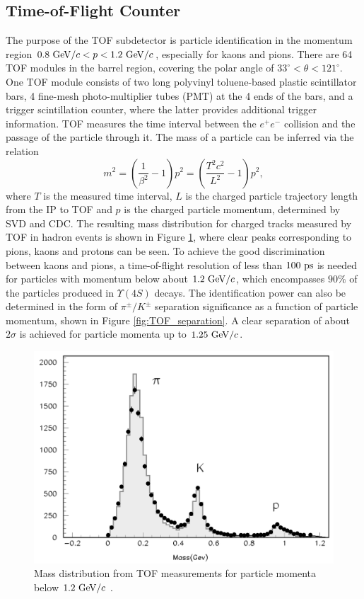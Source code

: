\subsection{Time-of-Flight Counter}

The purpose of the TOF subdetector is particle identification in the momentum region $0.8\mathrm{~GeV}/c < p < 1.2\mathrm{~GeV}/c$, especially for kaons and pions. There are 64 TOF modules in the barrel region, covering the polar angle of $33^\circ < \theta < 121^\circ$. One TOF module consists of two long polyvinyl toluene-based plastic scintillator bars, 4 fine-mesh photo-multiplier tubes (PMT) at the 4 ends of the bars, and a trigger scintillation counter, where the latter provides additional trigger information. TOF measures the time interval between the $e^+e^-$ collision and the passage of the particle through it. The mass of a particle can be inferred via the relation
\begin{equation}
m^2 = \left( \frac{1}{\beta^2}-1\right)p^2 = \left( \frac{T^2c^2}{L^2}-1\right)p^2,
\end{equation}
where $T$ is the measured time interval, $L$ is the charged particle trajectory length from the IP to TOF and $p$ is the charged particle momentum, determined by SVD and CDC. The resulting mass distribution for charged tracks measured by TOF in hadron events is shown in Figure \ref{fig:TOF_mass}, where clear peaks corresponding to pions, kaons and protons can be seen. To achieve the good discrimination between kaons and pions, a time-of-flight resolution of less than $100\mathrm{~ps}$ is needed for particles with momentum below about $1.2\mathrm{~GeV}/c$, which encompasses $90\%$ of the particles produced in $\Upsilon(4S)$ decays. The identification power can also be determined in the form of $\pi^\pm/K^\pm$ separation significance as a function of particle momentum, shown in Figure \ref{fig:TOF_separation}. A clear separation of about $2\sigma$ is achieved for particle momenta up to $1.25\mathrm{~GeV}/c$.

\begin{figure}[H]
	\centering
	\captionsetup{width=0.8\linewidth}
	\includegraphics[width=0.6\linewidth]{fig/setup/TOF_mass}
	\caption{Mass distribution from TOF measurements for particle momenta below $1.2\mathrm{~GeV}/c$ \cite{ABASHIAN2002117}.}
	\label{fig:TOF_mass}
\end{figure}

